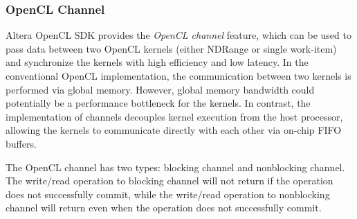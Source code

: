 \subsubsection{OpenCL Channel}

Altera OpenCL SDK provides the \emph{OpenCL channel} feature, which can be used to pass data between two OpenCL kernels (either NDRange or single work-item) and synchronize the kernels with high efficiency and low latency. In the conventional OpenCL implementation, the communication between two kernels is performed via global memory. However, global memory bandwidth could potentially be a performance bottleneck for the kernels. In contrast, the implementation of channels decouples kernel execution from the host processor, allowing the kernels to communicate directly with each other via on-chip FIFO buffers.

The OpenCL channel has two types: blocking channel and nonblocking channel. The write/read operation to blocking channel will not return if the operation does not successfully commit, while the write/read operation to nonblocking channel will return even when the operation does not successfully commit.







